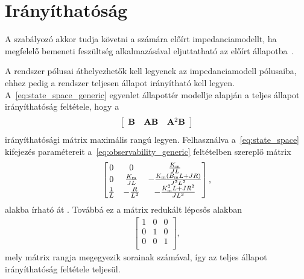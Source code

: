 \clearpage


\section{Irányíthatóság}\label{chap:controllability}
A szabályozó akkor tudja követni a számára előírt impedanciamodellt, 
ha megfelelő bemeneti feszültség alkalmazásával eljuttatható az előírt állapotba~\citep{kalman1963controllability}.

A rendszer pólusai áthelyezhetők kell legyenek az impedanciamodell pólusaiba, 
ehhez pedig a rendszer teljesen állapot irányítható kell legyen.
A~\eqref{eq:state_space_generic} egyenlet állapottér modellje alapján a teljes állapot irányíthatóság feltétele, hogy a
\begin{align}\label{eq:controllability_generic}
    \left[\begin{array}{c|c|c}
        \mathbf{B} & \mathbf{AB} & \mathbf{A}^2 \mathbf{B}
    \end{array}\right]
\end{align}
irányíthatósági mátrix maximális rangú legyen. 
Felhasználva a~\eqref{eq:state_space} kifejezés paramétereit a~\alert{\eqref{eq:observability_generic}}  feltételben szereplő mátrix
\begin{align}
    \begin{bmatrix}
        0 & 0 & \frac{K_{\mathrm{m}}}{JL} \\
        0 & \frac{K_{\mathrm{m}}}{JL} & -\frac{K_{\mathrm{m}}\left(B_{\mathrm{m}} L + JR\right)}{J^2 L^2} \\
        \frac{1}{L} & -\frac{R}{L^2} & -\frac{K^2_{\mathrm{m}} L + JR^2}{J L^3} \\
    \end{bmatrix},
\end{align}
alakba írható át . Továbbá ez a mátrix redukált lépcsős alakban
\begin{align}
    \begin{bmatrix}
        1 & 0 & 0 \\
        0 & 1 & 0 \\
        0 & 0 & 1 \\
    \end{bmatrix},
\end{align}
mely mátrix rangja megegyezik sorainak számával, így az teljes állapot irányíthatóság feltétele teljesül.

